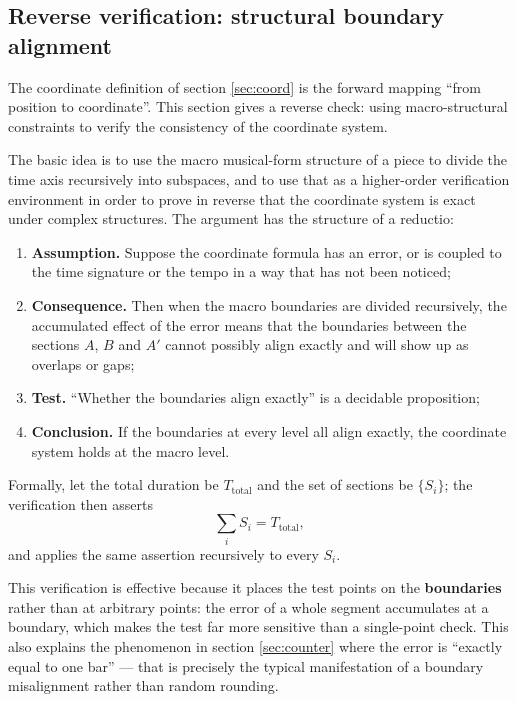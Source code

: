 \documentclass[11pt,a4paper]{article}
\begin{document}
\subsection{Reverse verification: structural boundary alignment}
\label{subsec:reverse}

The coordinate definition of section \ref{sec:coord} is the forward mapping ``from
position to coordinate''. This section gives a reverse check: using macro-structural
constraints to verify the consistency of the coordinate system.

The basic idea is to use the macro musical-form structure of a piece to divide the time
axis recursively into subspaces, and to use that as a higher-order verification
environment in order to prove in reverse that the coordinate system is exact under
complex structures. The argument has the structure of a reductio:

\begin{enumerate}[leftmargin=2.2em,itemsep=0.15em,topsep=0.2em]
  \item \textbf{Assumption.} Suppose the coordinate formula has an error, or is coupled
        to the time signature or the tempo in a way that has not been noticed;
  \item \textbf{Consequence.} Then when the macro boundaries are divided recursively,
        the accumulated effect of the error means that the boundaries between the
        sections $A$, $B$ and $A'$ cannot possibly align exactly and will show up as
        overlaps or gaps;
  \item \textbf{Test.} ``Whether the boundaries align exactly'' is a decidable
        proposition;
  \item \textbf{Conclusion.} If the boundaries at every level all align exactly, the
        coordinate system holds at the macro level.
\end{enumerate}

Formally, let the total duration be $T_{\mathrm{total}}$ and the set of sections be
$\{S_i\}$; the verification then asserts
\begin{equation}
  \label{eq:verify}
  \sum_i S_i = T_{\mathrm{total}},
\end{equation}
and applies the same assertion recursively to every $S_i$.

\begin{remark}
This verification is effective because it places the test points on the
\textbf{boundaries} rather than at arbitrary points: the error of a whole segment
accumulates at a boundary, which makes the test far more sensitive than a single-point
check. This also explains the phenomenon in section \ref{sec:counter} where the error is
``exactly equal to one bar'' --- that is precisely the typical manifestation of a
boundary misalignment rather than random rounding.
\end{remark}
\end{document}
